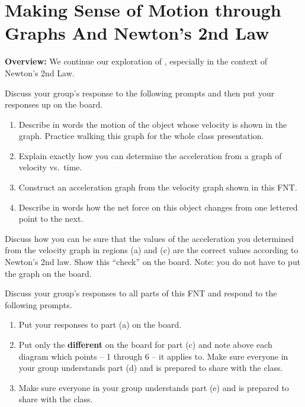 \section[\motiongraphs{} and Newton's 2nd Law]{Making Sense of Motion through Graphs And Newton's 2nd Law}
\label{act8.2.3}

\begin{overview}

\textbf{Overview:} We continue our exploration of \motiongraphs{}, especially in the context of Newton's 2nd Law.

\end{overview}

\begin{fnt}
	
\end{fnt}

\noindent Discuss your group's response to the following prompts and then put your responses up on the board.
\begin{enumerate}
	\item Describe in words the motion of the object whose velocity is shown in the graph. Practice walking this graph for the whole class presentation.
	\item Explain exactly how you can determine the acceleration from a graph of velocity vs.\ time.
	\item Construct an acceleration graph from the velocity graph shown in this FNT.
	\item Describe in words how the net force on this object changes from one lettered point to the next.
\end{enumerate}

\WCD

\begin{fnt}
	
\end{fnt}

\noindent Discuss how you can be sure that the values of the acceleration you determined from the velocity graph in regions (a) and (c) are the correct values according to Newton's 2nd law. Show this ``check'' on the board. Note: you do not have to put the graph on the board.\\

\WCD

\newpage

\begin{fnt}
	
\end{fnt}

\noindent Discuss your group's responses to all parts of this FNT and respond to the following prompts.
\begin{enumerate}
	\item Put your responses to part (a) on the board.
	\item Put only the \textbf{different} \forcediags{} on the board for part (c) and note above each diagram which points -- 1 through 6 -- it applies to. Make sure everyone in your group understands part (d) and is prepared to share with the class.
	\item Make sure everyone in your group understands part (e) and is prepared to share with the class.
\end{enumerate}

